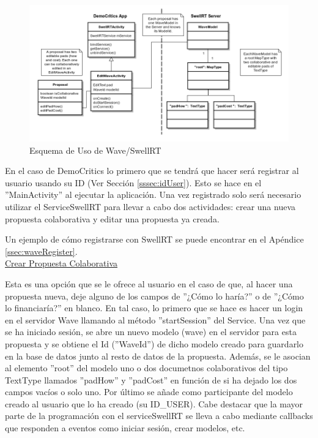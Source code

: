 	\begin{figure}[H]
	  \centering
	    \includegraphics[keepaspectratio, scale=0.5]{Media/Diagrams/collaborativeProposalDiagram.png}
	  \caption{Esquema de Uso de Wave/SwellRT}
	  \label{fig:diagramUseSwellRT}
	\end{figure}	
			
		En el caso de DemoCritics lo primero que se tendrá que hacer será registrar al usuario usando su ID (Ver Sección \ref{sssec:idUser}). Esto se hace en el ''MainActivity'' al ejecutar la aplicación.  Una vez registrado solo será necesario utilizar el ServiceSwellRT para llevar a cabo dos actividades: crear una nueva propuesta colaborativa y editar una propuesta ya creada. 
		
		Un ejemplo de cómo registrarse con SwellRT se puede encontrar en el Apéndice \ref{ssec:waveRegister}. \\

		\underline{Crear Propuesta Colaborativa}
		
		Esta es una opción que se le ofrece al usuario en el caso de que, al hacer una propuesta nueva, deje alguno de los campos de ''¿Cómo lo haría?'' o de ''¿Cómo lo financiaría?'' en blanco. En tal caso, lo primero que se hace es hacer un login en el servidor Wave llamando al método ''startSession'' del Service. Una vez que se ha iniciado sesión, se abre un nuevo modelo (wave) en el servidor para esta propuesta y se obtiene el Id (''WaveId'') de dicho modelo creado para guardarlo en la base de datos junto al resto de datos de la propuesta. Además, se le asocian al elemento ''root'' del modelo uno o dos documetnos colaborativos del tipo TextType llamados ''padHow'' y ''padCost'' en función de si ha dejado los dos campos vacíos o solo uno. Por último se añade como participante del modelo creado al usuario que lo ha creado (su ID\_USER). Cabe destacar que la mayor parte de la programación con el serviceSwellRT se lleva a cabo mediante callbacks que responden a eventos como iniciar sesión, crear modelos, etc.
		
